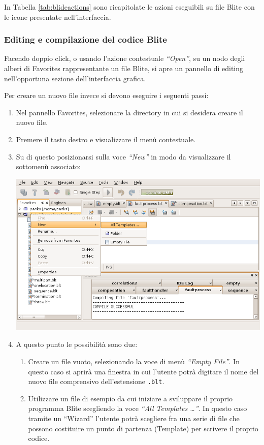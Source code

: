 In Tabella \ref{tab:blideactions} sono ricapitolate le azioni eseguibili su file Blite con le
icone presentate nell'interfaccia.

\newpage

\subsubsection*{Editing e compilazione del codice Blite}
Facendo doppio click, o usando l'azione contestuale \emph{``Open''}, su un nodo
degli alberi di Favorites rappresentante un file Blite, si apre un pannello di
editing nell'opportuna sezione dell'interfaccia grafica. 

Per creare un nuovo file invece si devono eseguire i seguenti passi:

\begin{enumerate}
  \item Nel pannello Favorites, selezionare la directory in cui si desidera
  creare il nuovo file.
  \item Premere il tasto destro e visualizzare il menù contestuale.
  \item Su di questo posizionarsi sulla voce \emph{``New''} in modo da
  visualizzare il sottomenù associato:
\begin{center}
\includegraphics[scale=0.60]{blide/dia/BlideNewFile}
\end{center}
  \item A questo punto le possibilità sono due:
\begin{enumerate}
  \item Creare un file vuoto, selezionando la voce di menù \emph{``Empty
  File''}. In questo caso si aprirà una finestra in cui l'utente potrà digitare
  il nome del nuovo file comprensivo dell'estensione \texttt{.blt}.
  \item Utilizzare un file di esempio da cui iniziare a
  sviluppare il proprio programma Blite scegliendo la voce \emph{``All
  Templates \ldots''}. In questo caso tramite un ``Wizard'' l'utente potrà
  scegliere fra una serie di file che possono costituire un punto di partenza
  (Template) per scrivere il proprio codice.
\end{enumerate} 
\end{enumerate}

